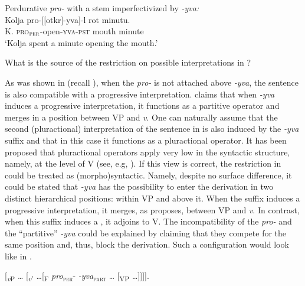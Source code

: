 \documentclass[output=paper,colorlinks,citecolor=brown,newtxmath]{langsci/langscibook}
\begin{document}
    \ea Perdurative \textit{pro-} with a stem imperfectivized by         \textit{-yva:}\label{ex:naumov:9}\smallskip\\
    \gll Kolja 	pro-[[otkr]-yva]-l 		rot 		minutu.\\
     K. \textsc{pro}$_\textsc{per}$-open-\textsc{yva}-\textsc{pst} mouth 		minute\\
    \glt `Kolja spent a minute opening the mouth.'
\z\z

\noindent What is the source of the restriction on possible interpretations in ?

As was shown in  (recall ), when the  \textit{pro-} is not attached above  \textit{-yva}, the sentence is also compatible with a progressive interpretation. \citet{tatevosov2015severing} claims that when \textit{-yva} induces a progressive interpretation, it functions as a partitive operator and merges in a position between VP and \textit{v}. One can naturally assume that the second (pluractional) interpretation of the sentence in  is also induced by the \textit{-yva} suffix and that in this case it functions as a pluractional operator. It has been proposed that pluractional operators apply very low in the syntactic structure, namely, at the level of V (see, e.g, \citealt{lasersohn1995plurality,van2004adverbials}). If this view is correct, the restriction in  could be treated as (morpho)syntactic. Namely, despite no surface difference, it could be stated that \textit{-yva} has the possibility to enter the derivation in two distinct hierarchical positions: within VP and above it. When the suffix induces a progressive interpretation, it merges, as \citet{tatevosov2015severing} proposes, between VP and \textit{v}. In contrast, when this suffix induces a , it adjoins to V. The incompatibility of the  \textit{pro-} and the ``partitive'' \textit{-yva} could be explained by claiming that they compete for the same position and, thus, block the derivation. Such a configuration would look like in .

\ea \label{ex:naumov:10}
{[\textsubscript{\textit{v}P} {\ldots} [\textsubscript{\textit{v}$'$} \ldots [\textsubscript{F} \textit{pro}\textsubscript{\textsc{per}}- \textit{-yva}\textsubscript{\textsc{part}} {\ldots} [\textsubscript{VP} {\ldots}]]]].}
\z
\end{document}
